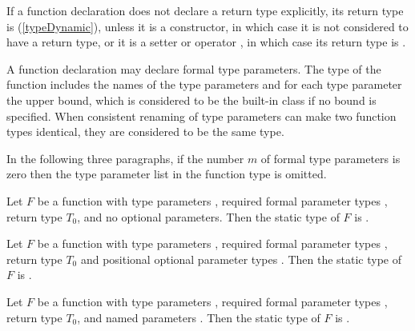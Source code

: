 \documentclass[makeidx]{article}
\begin{document}

\LMHash{}%
If a function declaration does not declare a return type explicitly,
its return type is \DYNAMIC{} (\ref{typeDynamic}),
unless it is a constructor,
in which case it is not considered to have a return type,
or it is a setter or operator \code{[]=},
in which case its return type is \VOID{}.

\LMHash{}%
A function declaration may declare formal type parameters.
The type of the function includes the names of the type parameters
and for each type parameter the upper bound,
which is considered to be the built-in class  if no bound is specified.
When consistent renaming of type parameters can make two function types identical,
they are considered to be the same type.


\LMHash{}%
In the following three paragraphs,
if the number $m$ of formal type parameters is zero then
the type parameter list in the function type is omitted.

\LMHash{}%
Let $F$ be a function with
type parameters \TypeParametersStd,
required formal parameter types ,
return type $T_0$,
and no optional parameters.
Then the static type of $F$ is
.

\LMHash{}%
Let $F$ be a function with
type parameters \TypeParametersStd,
required formal parameter types  ,
return type $T_0$
and positional optional parameter types .
Then the static type of $F$ is
.

\LMHash{}%
Let $F$ be a function with
type parameters \TypeParametersStd,
required formal parameter types ,
return type $T_0$,
and named parameters .
Then the static type of $F$ is
.
\end{document}
